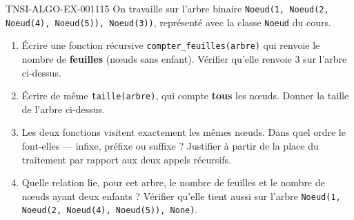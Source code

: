 \begin{exercice}{TNSI-ALGO-EX-001}{1}{15}
On travaille sur l'arbre binaire
\lstinline{Noeud(1, Noeud(2, Noeud(4), Noeud(5)), Noeud(3))}, représenté avec la
classe \lstinline{Noeud} du cours.
\begin{enumerate}
  \item Écrire une fonction récursive \lstinline{compter_feuilles(arbre)} qui
    renvoie le nombre de \textbf{feuilles} (n\oe{}uds sans enfant). Vérifier
    qu'elle renvoie $3$ sur l'arbre ci-dessus.
  \item Écrire de même \lstinline{taille(arbre)}, qui compte \textbf{tous} les
    n\oe{}uds. Donner la taille de l'arbre ci-dessus.
  \item Les deux fonctions visitent exactement les mêmes n\oe{}uds. Dans quel
    ordre le font-elles — infixe, préfixe ou suffixe ? Justifier à partir de la
    place du traitement par rapport aux deux appels récursifs.
  \item Quelle relation lie, pour cet arbre, le nombre de feuilles et le nombre
    de n\oe{}uds ayant deux enfants ? Vérifier qu'elle tient aussi sur l'arbre
    \lstinline{Noeud(1, Noeud(2, Noeud(4), Noeud(5)), None)}.
\end{enumerate}
\end{exercice}
